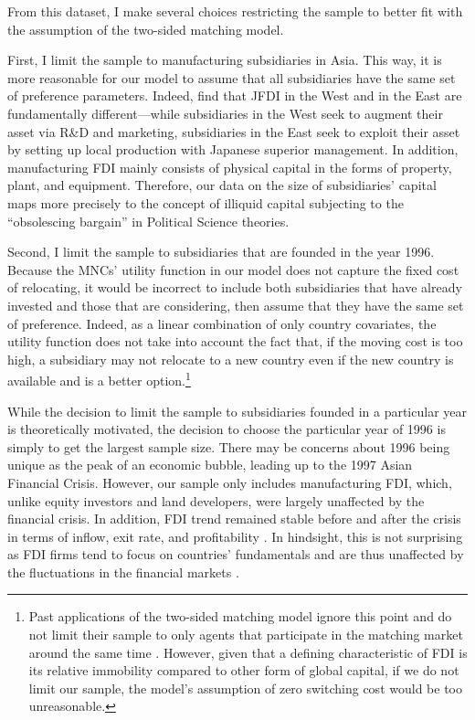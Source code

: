 From this dataset, I make several choices restricting the sample to better fit
with the assumption of the two-sided matching model.

First, I limit the sample to manufacturing subsidiaries in Asia. This way, it is
more reasonable
for our model to assume
that all subsidiaries have the same set of preference parameters. Indeed,
\citet{Pak2005} find that JFDI in the West and in the East are
fundamentally different---while subsidiaries in the West seek
to augment their asset via R\&D and marketing, subsidiaries in the East seek to exploit their
asset by setting up local production with Japanese superior management. In addition, manufacturing FDI mainly
consists of physical capital in the forms of property, plant, and equipment.
Therefore, our data on the size of subsidiaries' capital maps more precisely to the
concept of illiquid capital subjecting to the ``obsolescing bargain'' in
Political Science theories.

Second, I limit the sample to subsidiaries that are founded in the year 1996. Because the MNCs'
utility function in our model does not capture the fixed cost of relocating, it
would be incorrect to include both subsidiaries that have already invested and
those that are considering, then assume that they have the same set of preference.
Indeed, as a linear combination of only country covariates, the utility function
does not take into account the fact that, if the moving cost is too high, a
subsidiary may not relocate to a new country even if the new country is
available and is a better option.\footnote{Past
applications of the two-sided matching model ignore this point and do not limit
their sample to only agents that participate in the matching market around
the same time \citep{Logan1996, Logan2008}. However, given that a defining
characteristic of FDI is its relative immobility compared to other form of
global capital, if we do not limit our sample, the model's assumption of zero switching cost would be too
unreasonable.}

While the decision to limit the sample to subsidiaries founded in a particular
year is theoretically motivated, the decision to choose the particular year of
1996 is simply to get the largest sample size. There may be concerns about 1996
being unique as the peak of an economic bubble, leading up to the 1997 Asian Financial Crisis.
However, our sample only includes manufacturing FDI, which, unlike equity
investors and land developers, were largely unaffected by the financial crisis.
In addition, FDI trend remained stable before and after the crisis in terms of
inflow, exit rate, and profitability \citep{Delios2001, UNCTAD1998}. In
hindsight, this is not surprising as FDI firms tend to focus on countries' fundamentals
and are thus unaffected by the fluctuations in the financial markets
\citep{Ahlquist2006}.


